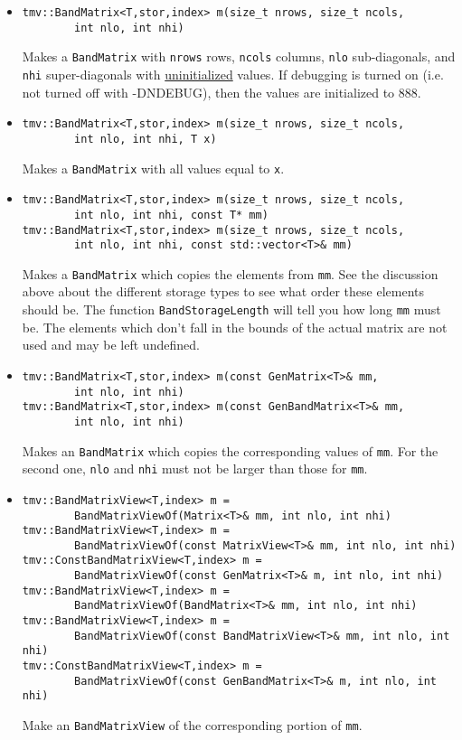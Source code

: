 \documentclass[twoside,letterpaper,11pt]{article}
\renewcommand{\tt}[1]{{\texttt {#1}}}
\begin{document}
\begin{itemize}
\item 
\begin{verbatim}
tmv::BandMatrix<T,stor,index> m(size_t nrows, size_t ncols, 
        int nlo, int nhi)
\end{verbatim}
Makes a \tt{BandMatrix} with \tt{nrows} rows, \tt{ncols} columns, 
\tt{nlo} sub-diagonals,
and \tt{nhi} super-diagonals with \underline{uninitialized} values.
If debugging is turned on (i.e. not turned off 
with -DNDEBUG), then the values are initialized to 888.

\item
\begin{verbatim}
tmv::BandMatrix<T,stor,index> m(size_t nrows, size_t ncols, 
        int nlo, int nhi, T x)
\end{verbatim}
Makes a \tt{BandMatrix} with all values equal to \tt{x}.

\item
\begin{verbatim}
tmv::BandMatrix<T,stor,index> m(size_t nrows, size_t ncols, 
        int nlo, int nhi, const T* mm)
tmv::BandMatrix<T,stor,index> m(size_t nrows, size_t ncols, 
        int nlo, int nhi, const std::vector<T>& mm)
\end{verbatim}
Makes a \tt{BandMatrix} which copies the elements from \tt{mm}.  See the 
discussion above about the different storage types to see what order these elements
should be.  The function \tt{BandStorageLength} will tell you how
long \tt{mm} must be.  The elements which don't fall in the bounds of the 
actual matrix are not used and may be left undefined.

\item 
\begin{verbatim}
tmv::BandMatrix<T,stor,index> m(const GenMatrix<T>& mm, 
        int nlo, int nhi)
tmv::BandMatrix<T,stor,index> m(const GenBandMatrix<T>& mm, 
        int nlo, int nhi)
\end{verbatim}
Makes an \tt{BandMatrix} which copies the corresponding values of \tt{mm}.  
For the second one, \tt{nlo} and \tt{nhi} must not be larger than those for \tt{mm}.

\item
\begin{verbatim}
tmv::BandMatrixView<T,index> m = 
        BandMatrixViewOf(Matrix<T>& mm, int nlo, int nhi)
tmv::BandMatrixView<T,index> m = 
        BandMatrixViewOf(const MatrixView<T>& mm, int nlo, int nhi)
tmv::ConstBandMatrixView<T,index> m = 
        BandMatrixViewOf(const GenMatrix<T>& m, int nlo, int nhi)
tmv::BandMatrixView<T,index> m = 
        BandMatrixViewOf(BandMatrix<T>& mm, int nlo, int nhi)
tmv::BandMatrixView<T,index> m = 
        BandMatrixViewOf(const BandMatrixView<T>& mm, int nlo, int nhi)
tmv::ConstBandMatrixView<T,index> m = 
        BandMatrixViewOf(const GenBandMatrix<T>& m, int nlo, int nhi)
\end{verbatim}
Make an \tt{BandMatrixView} of the corresponding portion of \tt{mm}.  


\end{itemize}
\end{document}
